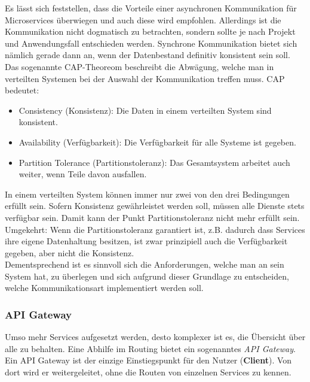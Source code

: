 Es lässt sich feststellen, dass die Vorteile einer asynchronen Kommunikation für Microservices überwiegen und auch diese wird empfohlen.\cite{wolff2018mic_praxis}\cite{bruce2019mic_in_action} Allerdings ist die Kommunikation nicht dogmatisch zu betrachten, sondern sollte je nach Projekt und Anwendungsfall entschieden werden. Synchrone Kommunikation bietet sich nämlich gerade dann an, wenn der Datenbestand definitiv konsistent sein soll. \\

Das sogenannte CAP-Theoreom beschreibt die Abwägung, welche man in verteilten Systemen bei der Auswahl der Kommunikation treffen muss. CAP bedeutet:
	\begin{itemize}
		\item Consistency (Konsistenz): Die Daten in einem verteilten System sind konsistent.
		\item Availability (Verfügbarkeit): Die Verfügbarkeit für alle Systeme ist gegeben. 
		\item Partition Tolerance (Partitionstoleranz): Das Gesamtsystem arbeitet auch weiter, wenn Teile davon ausfallen. 
	\end{itemize}  

In einem verteilten System können immer nur zwei von den drei Bedingungen erfüllt sein.\cite{wolff2018mic_praxis} Sofern Konsistenz gewährleistet werden soll, müssen alle Dienste stets verfügbar sein. Damit kann der Punkt Partitionstoleranz nicht mehr erfüllt sein. Umgekehrt: Wenn die Partitionstoleranz garantiert ist, z.B. dadurch dass Services ihre eigene Datenhaltung besitzen, ist zwar prinzipiell auch die Verfügbarkeit gegeben, aber nicht die Konsistenz. \\

Dementsprechend ist es sinnvoll sich die Anforderungen, welche man an sein System hat, zu überlegen und sich aufgrund dieser Grundlage zu entscheiden, welche Kommunikationsart implementiert werden soll. 

\subsubsection{API Gateway}

Umso mehr Services aufgesetzt werden, desto komplexer ist es, die Übersicht über alle zu behalten. Eine Abhilfe im Routing bietet ein sogenanntes \textit{API Gateway}. Ein API Gateway ist der einzige Einstiegspunkt für den Nutzer (\textbf{Client}). Von dort wird er weitergeleitet, ohne die Routen von einzelnen Services zu kennen. 

